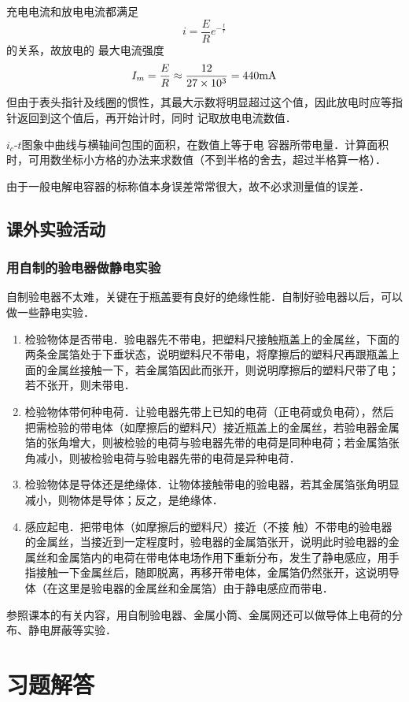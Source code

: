 充电电流和放电电流都满足
\[i=\frac{E}{R}e^{-\frac{t}{r}}\]的关系，故放电的
最大电流强度
\[I_m=\frac{E}{R}\approx \frac{12}{ 27\times10^3}=440{\rm mA}\]但由于表头指针及线圈的惯性，其最大示数将明显超过这个值，因此放电时应等指针返回到这个值后，再开始计时，同时
记取放电电流数值．

$i_c$-$t$图象中曲线与横轴间包围的面积，在数值上等于电
容器所带电量．计算面积时，可用数坐标小方格的办法来求数值（不到半格的舍去，超过半格算一格）．

由于一般电解电容器的标称值本身误差常常很大，故不必求测量值的误差．

\subsection{课外实验活动}
\subsubsection{用自制的验电器做静电实验}

自制验电器不太难，关键在于瓶盖要有良好的绝缘性能．自制好验电器以后，可以做一些静电实验．

\begin{enumerate}
    \item 检验物体是否带电．验电器先不带电，把塑料尺接触瓶盖上的金属丝，下面的两条金属箔处于下垂状态，说明塑料尺不带电，将摩擦后的塑料尺再跟瓶盖上面的金属丝接触一下，若金属箔因此而张开，则说明摩擦后的塑料尺带了电；若不张开，则未带电．
    \item 检验物体带何种电荷．让验电器先带上已知的电荷（正电荷或负电荷），然后把需检验的带电体（如摩擦后的塑料尺）接近瓶盖上的金属丝，若验电器金属箔的张角增大，则被检验的电荷与验电器先带的电荷是同种电荷；若金属箔张角减小，则被检验电荷与验电器先带的电荷是异种电荷．    
    \item 检验物体是导体还是绝缘体．让物体接触带电的验电器，若其金属箔张角明显减小，则物体是导体；反之，是绝缘体．
    \item 感应起电．把带电体（如摩擦后的塑料尺）接近（不接
    触）不带电的验电器的金属丝，当接近到一定程度时，验电器的金属箔张开，说明此时验电器的金属丝和金属箔内的电荷在带电体电场作用下重新分布，发生了静电感应，用手指接触一下金属丝后，随即脱离，再移开带电体，金属箔仍然张开，这说明导体（在这里是验电器的金属丝和金属箔）由于静电感应而带电．
\end{enumerate}

    参照课本的有关内容，用自制验电器、金属小筒、金属网还可以做导体上电荷的分布、静电屏蔽等实验．

\section{习题解答}
